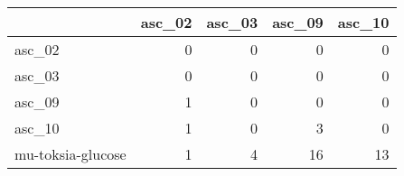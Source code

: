 \begin{tabular}{lrrrr}
\toprule
 & asc_02 & asc_03 & asc_09 & asc_10 \\
\midrule
asc_02 & 0 & 0 & 0 & 0 \\
asc_03 & 0 & 0 & 0 & 0 \\
asc_09 & 1 & 0 & 0 & 0 \\
asc_10 & 1 & 0 & 3 & 0 \\
mu-toksia-glucose & 1 & 4 & 16 & 13 \\
\bottomrule
\end{tabular}
